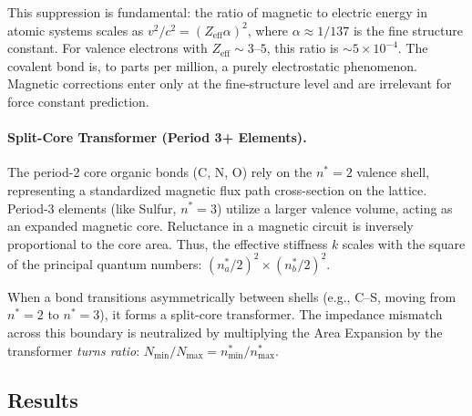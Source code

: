 This suppression is fundamental: the ratio of magnetic to electric energy in atomic systems scales as $v^2/c^2 = (Z_\text{eff} \alpha)^2$, where $\alpha \approx 1/137$ is the fine structure constant. For valence electrons with $Z_\text{eff} \sim 3\text{--}5$, this ratio is $\sim 5 \times 10^{-4}$. The covalent bond is, to parts per million, a purely electrostatic phenomenon. Magnetic corrections enter only at the fine-structure level and are irrelevant for force constant prediction.

\paragraph{Split-Core Transformer (Period 3+ Elements).}
The period-2 core organic bonds (C, N, O) rely on the $n^*=2$ valence shell, representing a standardized magnetic flux path cross-section on the lattice. Period-3 elements (like Sulfur, $n^*=3$) utilize a larger valence volume, acting as an expanded magnetic core. Reluctance in a magnetic circuit is inversely proportional to the core area. Thus, the effective stiffness $k$ scales with the square of the principal quantum numbers: $(n^*_a/2)^2 \times (n^*_b/2)^2$.

When a bond transitions asymmetrically between shells (e.g., C--S, moving from $n^*=2$ to $n^*=3$), it forms a split-core transformer. The impedance mismatch across this boundary is neutralized by multiplying the Area Expansion by the transformer \emph{turns ratio}: $N_\text{min} / N_\text{max} = n^*_\text{min} / n^*_\text{max}$.

\subsection{Results}

